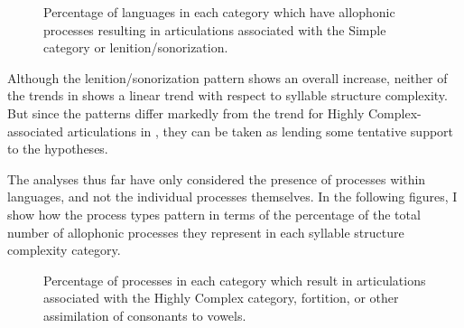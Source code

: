 \begin{figure}
\caption{\label{fig:7.3}Percentage of languages in each category which have allophonic processes resulting in articulations associated with the Simple category or lenition/sonorization.}
\end{figure}
  Although the lenition/sonorization pattern shows an overall increase, neither of the trends in  shows a linear trend with respect to syllable structure complexity. But since the patterns differ markedly from the trend for Highly Complex-associated articulations in , they can be taken as lending some tentative support to the hypotheses.

  The analyses thus far have only considered the presence of processes within languages, and not the individual processes themselves. In the following figures, I show how the process types pattern in terms of the percentage of the total number of allophonic processes they represent in each syllable structure complexity category.

\begin{figure}[t]
\caption{\label{fig:7.4}Percentage of processes in each category which result in articulations associated with the Highly Complex category, fortition, or other assimilation of consonants to vowels.}
\end{figure}

